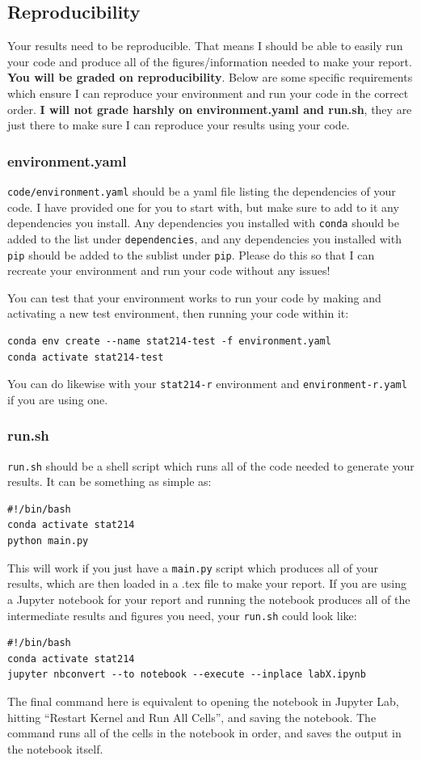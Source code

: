 \documentclass[letterpaper,12pt]{article}
\begin{document}
\subsection{Reproducibility}
Your results need to be reproducible. That means I should be able to easily run your code and produce all of the figures/information needed to make your report. \textbf{You will be graded on reproducibility}. Below are some specific requirements which ensure I can reproduce your environment and run your code in the correct order. \textbf{I will not grade harshly on environment.yaml and run.sh}, they are just there to make sure I can reproduce your results using your code.
\subsubsection{environment.yaml}
\texttt{code/environment.yaml} should be a yaml file listing the dependencies of your code. I have provided one for you to start with, but make sure to add to it any dependencies you install. Any dependencies you installed with \texttt{conda} should be added to the list under \texttt{dependencies}, and any dependencies you installed with \texttt{pip} should be added to the sublist under \texttt{pip}. Please do this so that I can recreate your environment and run your code without any issues!

You can test that your environment works to run your code by making and activating a new test environment, then running your code within it:
\begin{verbatim}
conda env create --name stat214-test -f environment.yaml
conda activate stat214-test
\end{verbatim}
You can do likewise with your \texttt{stat214-r} environment and \texttt{environment-r.yaml} if you are using one.

\subsubsection{run.sh}
\texttt{run.sh} should be a shell script which runs all of the code needed to generate your results. It can be something as simple as:
\begin{verbatim}
#!/bin/bash
conda activate stat214
python main.py
\end{verbatim}
This will work if you just have a \texttt{main.py} script which produces all of your results, which are then loaded in a .tex file to make your report. If you are using a Jupyter notebook for your report and running the notebook produces all of the intermediate results and figures you need, your \texttt{run.sh} could look like:
\begin{verbatim}
#!/bin/bash
conda activate stat214
jupyter nbconvert --to notebook --execute --inplace labX.ipynb
\end{verbatim}
The final command here is equivalent to opening the notebook in Jupyter Lab, hitting ``Restart Kernel and Run All Cells'', and saving the notebook. The command runs all of the cells in the notebook in order, and saves the output in the notebook itself.
\end{document}
